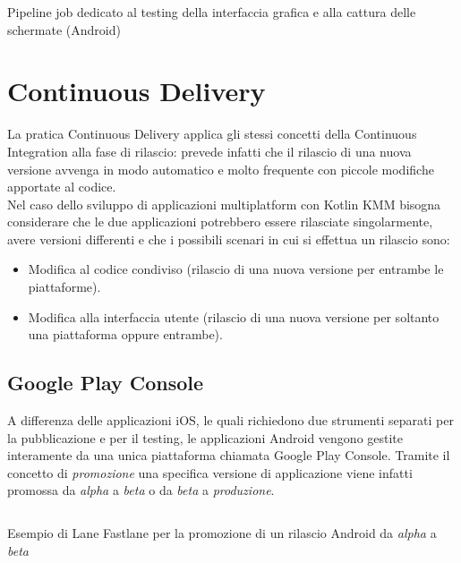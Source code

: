 \begin{listing}[H]
\inputminted{yaml}{code/4-screenshot-ui-android}
\caption{Pipeline job dedicato al testing della interfaccia grafica e alla cattura delle schermate (Android)}
\end{listing}

\section{Continuous Delivery}
La pratica Continuous Delivery applica gli stessi concetti della Continuous Integration alla fase di rilascio: prevede infatti che il rilascio di una nuova versione avvenga in modo automatico e molto frequente con piccole modifiche apportate al codice.\\
Nel caso dello sviluppo di applicazioni multiplatform con Kotlin KMM bisogna considerare che le due applicazioni potrebbero essere rilasciate singolarmente, avere versioni differenti e che i possibili scenari in cui si effettua un rilascio sono:
\begin{itemize}
    \item Modifica al codice condiviso (rilascio di una nuova versione per entrambe le piattaforme).
    \item Modifica alla interfaccia utente (rilascio di una nuova versione per soltanto una piattaforma oppure entrambe).
\end{itemize}

\subsection{Google Play Console}
A differenza delle applicazioni iOS, le quali richiedono due strumenti separati per la pubblicazione e per il testing, le applicazioni Android vengono gestite interamente da una unica piattaforma chiamata Google Play Console. Tramite il concetto di \textit{promozione} una specifica versione di applicazione viene infatti promossa da \textit{alpha} a \textit{beta} o da \textit{beta} a \textit{produzione}.

\begin{listing}[H]
\inputminted{ruby}{code/4-gpc-promote}
\caption{Esempio di Lane Fastlane per la promozione di un rilascio Android da \textit{alpha} a \textit{beta}}
\end{listing}

